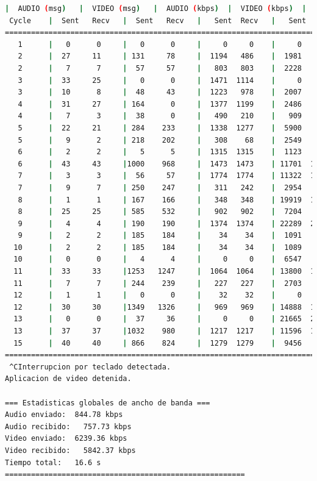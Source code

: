 \begin{lstlisting}[language=bash,basicstyle=\ttfamily\scriptsize]
          |  AUDIO (msg)   |  VIDEO (msg)   |  AUDIO (kbps)  |  VIDEO (kbps)  |   CPU (%)
 Cycle    |  Sent   Recv   |  Sent   Recv   |   Sent  Recv   |   Sent  Recv   | Program System
============================================================================================
   1      |   0      0     |   0      0     |     0     0    |     0     0    |   0      0
   2      |  27     11     | 131     78     |  1194   486    |  1981   1179   |  29     80
   2      |   7      7     |  57     57     |   803   803    |  2228   2237   |  24     85
   3      |  33     25     |   0      0     |  1471  1114    |     0      0   |  25     95
   3      |  10      8     |  48     43     |  1223   978    |  2007   1788   |  33     92
   4      |  31     27     | 164      0     |  1377  1199    |  2486      0   |  24     89
   4      |   7      3     |  38      0     |   490   210    |   909      0   |  29     66
   5      |  22     21     | 284    233     |  1338  1277    |  5900   4839   |  31     62
   5      |   9      2     | 218    202     |   308    68    |  2549   2367   |  33     45
   6      |   2      2     |   5      5     |  1315  1315    |  1123   1123   |  40     20
   6      |  43     43     |1000    968     |  1473  1473    | 11701  11326   |  41     91
   7      |   3      3     |  56     57     |  1774  1774    | 11322  11478   |  72     90
   7      |   9      7     | 250    247     |   311   242    |  2954   2921   |  33     22
   8      |   1      1     | 167    166     |   348   348    | 19919  19772   |  10     25
   8      |  25     25     | 585    532     |   902   902    |  7204   6556   |  37     67
   9      |   4      4     | 190    190     |  1374  1374    | 22289  22289   |  52     65
   9      |   2      2     | 185    184     |    34    34    |  1091   1086   |  35      5
  10      |   2      2     | 185    184     |    34    34    |  1089   1083   |  35      2
  10      |   0      0     |   4      4     |     0     0    |  6547   6547   |   0     89
  11      |  33     33     |1253   1247     |  1064  1064    | 13800  13734   |  48     89
  11      |   7      7     | 244    239     |   227   227    |  2703   2650   |  37     15
  12      |   1      1     |   0      0     |    32    32    |     0      0   |   0     17
  12      |  30     30     |1349   1326     |   969   969    | 14888  14633   |  38     83
  13      |   0      0     |  37     36     |     0     0    | 21665  21079   |  52     82
  13      |  37     37     |1032    980     |  1217  1217    | 11596  11011   |  31     86
  15      |  40     40     | 866    824     |  1279  1279    |  9456   8994   |  31     85
============================================================================================
 ^CInterrupcion por teclado detectada.
Aplicacion de video detenida.

=== Estadisticas globales de ancho de banda ===
Audio enviado:	844.78 kbps
Audio recibido:   757.73 kbps
Video enviado:	6239.36 kbps
Video recibido:   5842.37 kbps
Tiempo total: 	16.6 s
=======================================================
\end{lstlisting}

